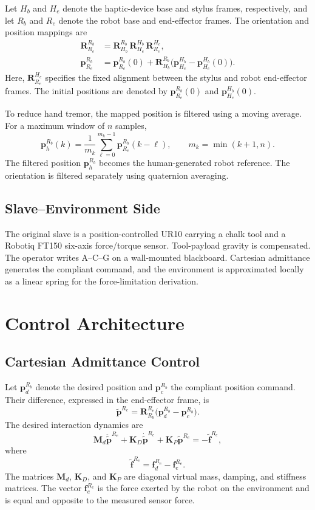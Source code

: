 \documentclass[journal]{IEEEtran}
\newcommand{\p}{\bm{p}}
\newcommand{\f}{\bm{f}}
\newcommand{\R}{\bm{R}}
\newcommand{\K}{\bm{K}}
\newcommand{\M}{\bm{M}}
\newcommand{\pt}{\widetilde{\bm{p}}}
\newcommand{\ft}{\widetilde{\bm{f}}}
\begin{document}
Let $H_b$ and $H_e$ denote the haptic-device base and stylus frames, respectively, and let $R_b$ and $R_e$ denote the robot base and end-effector frames. The orientation and position mappings are
\begin{align}
\R^{R_b}_{R_e} &= \R^{R_b}_{H_b}\,\R^{H_b}_{H_e}\,\R^{H_e}_{R_e}, \\
\p^{R_b}_{R_e} &= \p^{R_b}_{R_e}(0) + \R^{R_b}_{H_b}\bigl(\p^{H_b}_{H_e}-\p^{H_b}_{H_e}(0)\bigr).
\end{align}
Here, $\R^{H_e}_{R_e}$ specifies the fixed alignment between the stylus and robot end-effector frames. The initial positions are denoted by $\p^{R_b}_{R_e}(0)$ and $\p^{H_b}_{H_e}(0)$.

To reduce hand tremor, the mapped position is filtered using a moving average. For a maximum window of $n$ samples,
\begin{equation}
\p^{R_b}_{h}(k)=\frac{1}{m_k}\sum_{\ell=0}^{m_k-1}\p^{R_b}_{R_e}(k-\ell),\qquad m_k=\min(k+1,n).
\end{equation}
The filtered position $\p^{R_b}_h$ becomes the human-generated robot reference. The orientation is filtered separately using quaternion averaging.

\subsection{Slave--Environment Side}
The original slave is a position-controlled UR10 carrying a chalk tool and a Robotiq FT150 six-axis force/torque sensor. Tool-payload gravity is compensated. The operator writes A--C--G on a wall-mounted blackboard. Cartesian admittance generates the compliant command, and the environment is approximated locally as a linear spring for the force-limitation derivation.

\section{Control Architecture}
\subsection{Cartesian Admittance Control}
Let $\p^{R_b}_d$ denote the desired position and $\p^{R_b}_c$ the compliant position command. Their difference, expressed in the end-effector frame, is
\begin{equation}
\pt^{R_e}=\R^{R_e}_{R_b}\bigl(\p^{R_b}_d-\p^{R_b}_c\bigr).
\end{equation}
The desired interaction dynamics are
\begin{equation}
\M_d\ddot{\pt}^{R_e}+\K_D\dot{\pt}^{R_e}+\K_P\pt^{R_e}=-\ft^{R_e},
\end{equation}
where
\begin{equation}
\ft^{R_e}=\f^{R_e}_d-\f^{R_e}_e.
\end{equation}
The matrices $\M_d$, $\K_D$, and $\K_P$ are diagonal virtual mass, damping, and stiffness matrices. The vector $\f^{R_e}_e$ is the force exerted by the robot on the environment and is equal and opposite to the measured sensor force.
\end{document}
